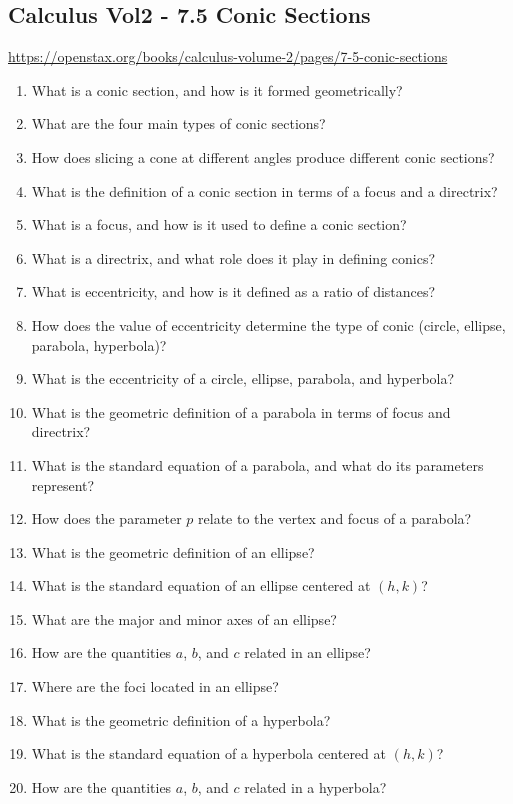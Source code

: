 \subsection{Calculus Vol2 - 7.5 Conic Sections}

\url{https://openstax.org/books/calculus-volume-2/pages/7-5-conic-sections}

\begin{enumerate}
  \item What is a conic section, and how is it formed geometrically?
  \item What are the four main types of conic sections?
  \item How does slicing a cone at different angles produce different conic sections?
  \item What is the definition of a conic section in terms of a focus and a directrix?
  \item What is a focus, and how is it used to define a conic section?
  \item What is a directrix, and what role does it play in defining conics?
  \item What is eccentricity, and how is it defined as a ratio of distances?
  \item How does the value of eccentricity determine the type of conic (circle, ellipse, parabola, hyperbola)?
  \item What is the eccentricity of a circle, ellipse, parabola, and hyperbola?
  \item What is the geometric definition of a parabola in terms of focus and directrix?
  \item What is the standard equation of a parabola, and what do its parameters represent?
  \item How does the parameter $p$ relate to the vertex and focus of a parabola?
  \item What is the geometric definition of an ellipse?
  \item What is the standard equation of an ellipse centered at $(h,k)$?
  \item What are the major and minor axes of an ellipse?
  \item How are the quantities $a$, $b$, and $c$ related in an ellipse?
  \item Where are the foci located in an ellipse?
  \item What is the geometric definition of a hyperbola?
  \item What is the standard equation of a hyperbola centered at $(h,k)$?
  \item How are the quantities $a$, $b$, and $c$ related in a hyperbola?

\end{enumerate}
